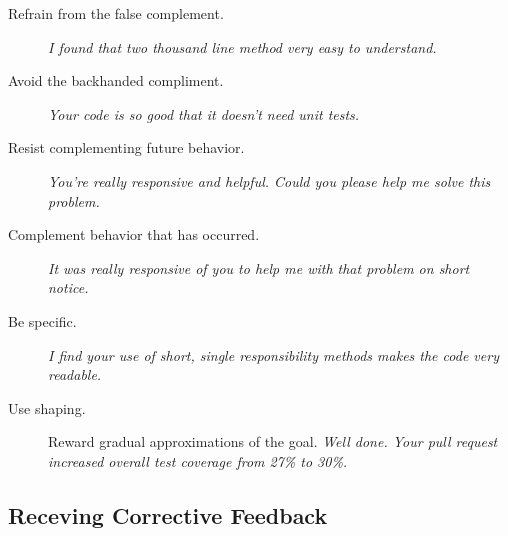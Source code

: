 \documentclass{article}
\begin{document}
\begin{tiny}
\begin{multicols}{3}
\begin{tcolorbox}[breakable,colback=rainbow2]
        \begin{description}
            \item[Refrain from the false complement.] \emph{I found that two thousand line method very easy to understand.}
            \item[Avoid the backhanded compliment.] \emph{Your code is so good that it doesn't need unit tests.}
            \item[Resist complementing future behavior.] \emph{You're really responsive and helpful. Could you please help me solve this problem.}
            \item[Complement behavior that has occurred.] \emph{It was really responsive of you to help me with that problem on short notice.}
            \item[Be specific.] \emph{I find your use of short, single responsibility methods makes the code very readable.}
            \item[Use shaping.] Reward gradual approximations of the goal. \emph{Well done. Your pull request increased overall test coverage from 27\% to 30\%.}
        \end{description}

    \end{tcolorbox}

    \begin{tcolorbox}[breakable,colback=rainbow3]

	\section*{Receving Corrective Feedback}


\end{tcolorbox}
\end{multicols}
\end{tiny}
\end{document}
